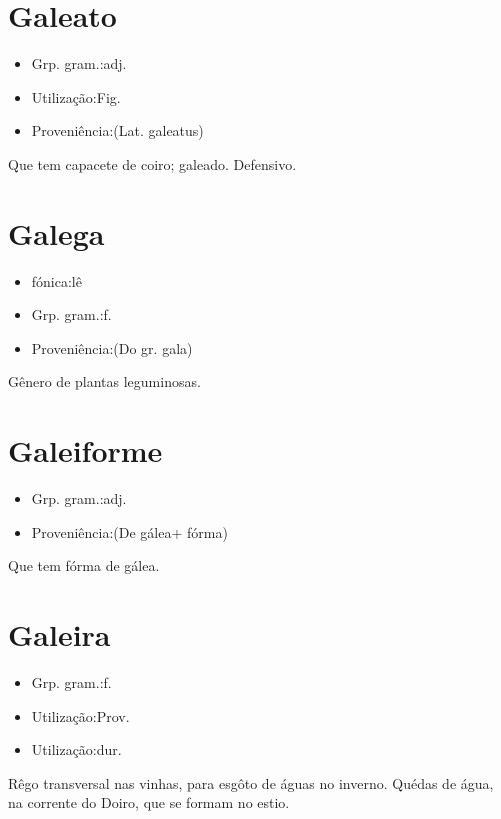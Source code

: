 \section{Galeato}
\begin{itemize}
\item {Grp. gram.:adj.}
\end{itemize}
\begin{itemize}
\item {Utilização:Fig.}
\end{itemize}
\begin{itemize}
\item {Proveniência:(Lat. \textunderscore galeatus\textunderscore )}
\end{itemize}
Que tem capacete de coiro; galeado.
Defensivo.
\section{Galega}
\begin{itemize}
\item {fónica:lê}
\end{itemize}
\begin{itemize}
\item {Grp. gram.:f.}
\end{itemize}
\begin{itemize}
\item {Proveniência:(Do gr. \textunderscore gala\textunderscore )}
\end{itemize}
Gênero de plantas leguminosas.
\section{Galeiforme}
\begin{itemize}
\item {Grp. gram.:adj.}
\end{itemize}
\begin{itemize}
\item {Proveniência:(De \textunderscore gálea\textunderscore  + \textunderscore fórma\textunderscore )}
\end{itemize}
Que tem fórma de gálea.
\section{Galeira}
\begin{itemize}
\item {Grp. gram.:f.}
\end{itemize}
\begin{itemize}
\item {Utilização:Prov.}
\end{itemize}
\begin{itemize}
\item {Utilização:dur.}
\end{itemize}
Rêgo transversal nas vinhas, para esgôto de águas no inverno.
Quédas de água, na corrente do Doiro, que se formam no estio.
